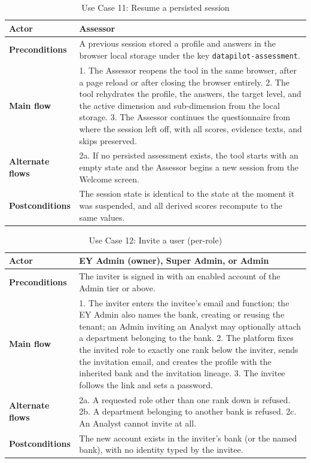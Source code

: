 \begin{table}[H]
\centering
\caption{Use Case 11: Resume a persisted session} \label{tab:uc11}
\begin{tabular}{|p{3cm}|p{12cm}|}
\hline
\textbf{Actor} & Assessor \\
\hline
\textbf{Preconditions} & A previous session stored a profile and answers in the browser local storage under the key \texttt{datapilot-assessment}. \\
\hline
\textbf{Main flow} & 1. The Assessor reopens the tool in the same browser, after a page reload or after closing the browser entirely. 2. The tool rehydrates the profile, the answers, the target level, and the active dimension and sub-dimension from the local storage. 3. The Assessor continues the questionnaire from where the session left off, with all scores, evidence texts, and skips preserved. \\
\hline
\textbf{Alternate flows} & 2a. If no persisted assessment exists, the tool starts with an empty state and the Assessor begins a new session from the Welcome screen. \\
\hline
\textbf{Postconditions} & The session state is identical to the state at the moment it was suspended, and all derived scores recompute to the same values. \\
\hline
\end{tabular}

\end{table}

\begin{table}[H]
\centering
\caption{Use Case 12: Invite a user (per-role)} \label{tab:uc12}
\begin{tabular}{|p{3cm}|p{12cm}|}
\hline
\textbf{Actor} & EY Admin (owner), Super Admin, or Admin \\
\hline
\textbf{Preconditions} & The inviter is signed in with an enabled account of the Admin tier or above. \\
\hline
\textbf{Main flow} & 1. The inviter enters the invitee's email and function; the EY Admin also names the bank, creating or reusing the tenant; an Admin inviting an Analyst may optionally attach a department belonging to the bank. 2. The platform fixes the invited role to exactly one rank below the inviter, sends the invitation email, and creates the profile with the inherited bank and the invitation lineage. 3. The invitee follows the link and sets a password. \\
\hline
\textbf{Alternate flows} & 2a. A requested role other than one rank down is refused. 2b. A department belonging to another bank is refused. 2c. An Analyst cannot invite at all. \\
\hline
\textbf{Postconditions} & The new account exists in the inviter's bank (or the named bank), with no identity typed by the invitee. \\
\hline
\end{tabular}

\end{table}

